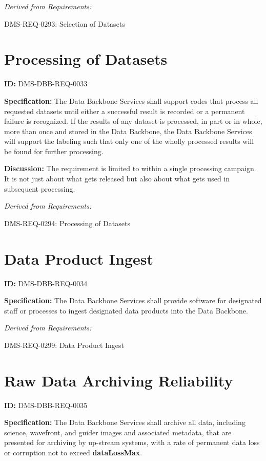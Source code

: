 \documentclass[SE,toc,lsstdraft]{lsstdoc}
\begin{document}
\emph{Derived from Requirements:}

DMS-REQ-0293:
Selection of Datasets \newline

\section{Processing of Datasets}

\label{DMS-DBB-REQ-0033}
\textbf{ID:} DMS-DBB-REQ-0033

\textbf{Specification:}
The Data Backbone Services shall support codes that process all requested datasets until either a successful result is recorded or a permanent failure is recognized. If the results of any dataset is processed, in part or in whole, more than once and stored in the Data Backbone, the Data Backbone Services will support the labeling such that only one of the wholly processed results will be found for further processing.

\textbf{Discussion:}
The requirement is limited to within a single processing campaign.   It is not just about what gets released but also about what gets used in subsequent processing.

\emph{Derived from Requirements:}

DMS-REQ-0294:
Processing of Datasets \newline

\section{Data Product Ingest}

\label{DMS-DBB-REQ-0034}
\textbf{ID:} DMS-DBB-REQ-0034

\textbf{Specification:}
The Data Backbone Services shall provide software for designated staff or processes to ingest designated data products into the Data Backbone.

\emph{Derived from Requirements:}

DMS-REQ-0299:
Data Product Ingest \newline

\section{Raw Data Archiving Reliability}

\label{DMS-DBB-REQ-0035}
\textbf{ID:} DMS-DBB-REQ-0035

\textbf{Specification:}
The Data Backbone Services shall archive all data, including science, wavefront, and guider images and associated metadata, that are presented for archiving by up-stream systems, with a rate of permanent data loss or corruption not to exceed \textbf{dataLossMax}.
\end{document}
